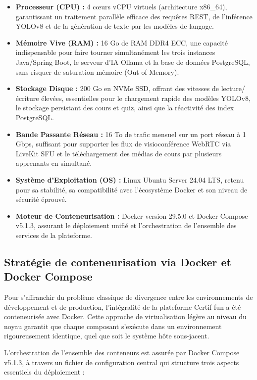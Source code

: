\begin{itemize}
    \item \textbf{Processeur (CPU) :} 4 cœurs vCPU virtuels (architecture x86\_64), garantissant un traitement parallèle efficace des requêtes REST, de l'inférence YOLOv8 et de la génération de texte par les modèles de langage.
    \item \textbf{Mémoire Vive (RAM) :} 16 Go de RAM DDR4 ECC, une capacité indispensable pour faire tourner simultanément les trois instances Java/Spring Boot, le serveur d'IA Ollama et la base de données PostgreSQL, sans risquer de saturation mémoire (Out of Memory).
    \item \textbf{Stockage Disque :} 200 Go en NVMe SSD, offrant des vitesses de lecture/écriture élevées, essentielles pour le chargement rapide des modèles YOLOv8, le stockage persistant des cours et quiz, ainsi que la réactivité des index PostgreSQL.
    \item \textbf{Bande Passante Réseau :} 16 To de trafic mensuel sur un port réseau à 1 Gbps, suffisant pour supporter les flux de visioconférence WebRTC via LiveKit SFU et le téléchargement des médias de cours par plusieurs apprenants en simultané.
    \item \textbf{Système d'Exploitation (OS) :} Linux Ubuntu Server 24.04 LTS, retenu pour sa stabilité, sa compatibilité avec l'écosystème Docker et son niveau de sécurité éprouvé.
    \item \textbf{Moteur de Conteneurisation :} Docker version 29.5.0 et Docker Compose v5.1.3, assurant le déploiement unifié et l'orchestration de l'ensemble des services de la plateforme.
\end{itemize}

\subsection{Stratégie de conteneurisation via Docker et Docker Compose}
Pour s'affranchir du problème classique de divergence entre les environnements de développement et de production, l'intégralité de la plateforme Certif-fun a été conteneurisée avec Docker. Cette approche de virtualisation légère au niveau du noyau garantit que chaque composant s'exécute dans un environnement rigoureusement identique, quel que soit le système hôte sous-jacent.

L'orchestration de l'ensemble des conteneurs est assurée par Docker Compose v5.1.3, à travers un fichier de configuration central  qui structure trois aspects essentiels du déploiement :

